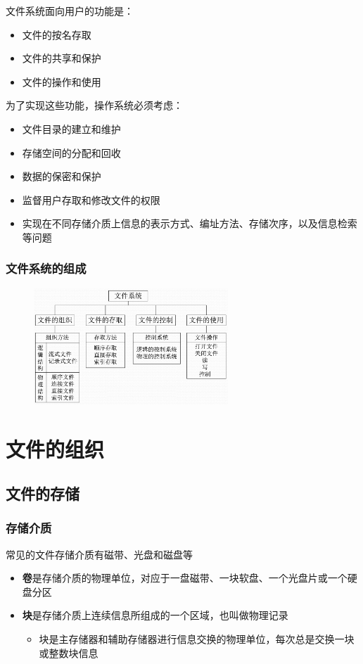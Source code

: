 \documentclass[cs4size,a4paper,10pt]{ctexart}
\begin{document}
	文件系统面向用户的功能是：
	\begin{itemize}
		\item 文件的按名存取
		\item 文件的共享和保护
		\item 文件的操作和使用
	\end{itemize}

	为了实现这些功能，操作系统必须考虑：
	\begin{itemize}
		\item 文件目录的建立和维护
		\item 存储空间的分配和回收
		\item 数据的保密和保护
		\item 监督用户存取和修改文件的权限
		\item 实现在不同存储介质上信息的表示方式、编址方法、存储次序，以及信息检索等问题
	\end{itemize}

	\subsubsection{文件系统的组成}
	\begin{figure}[H]
		\centering
		\includegraphics[width=0.65\textwidth]{img/5.1.2.2}
	\end{figure}


	\section{文件的组织}
	\subsection{文件的存储}

	\subsubsection{存储介质}
	常见的文件存储介质有磁带、光盘和磁盘等
	\begin{itemize}
		\item \textbf{卷}是存储介质的物理单位，对应于一盘磁带、一块软盘、一个光盘片或一个硬盘分区
		\item \textbf{块}是存储介质上连续信息所组成的一个区域，也叫做物理记录
		\begin{itemize}
			\item 块是主存储器和辅助存储器进行信息交换的物理单位，每次总是交换一块或整数块信息
		\end{itemize}
	\end{itemize}
\end{document}
